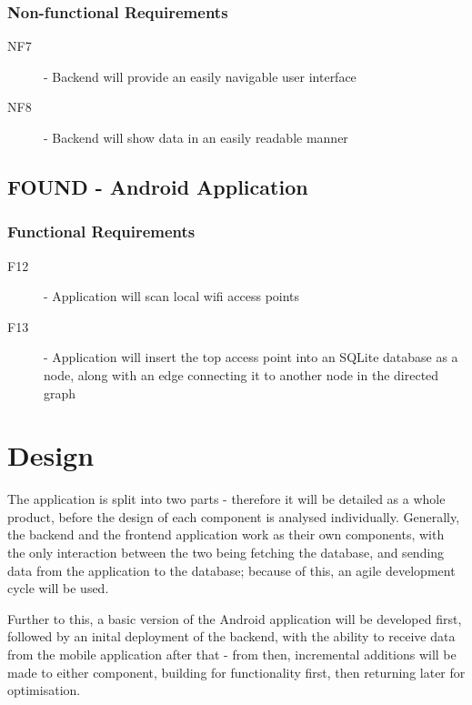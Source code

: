 \documentclass[11pt]{informatics-report}
\begin{document}
\subsection{Non-functional Requirements}

\begin{description}
\item[NF7] - Backend will provide an easily navigable user interface
\item[NF8] - Backend will show data in an easily readable manner
\end{description}

\section{FOUND - Android Application}

\subsection{Functional Requirements}

\begin{description}
\item[F12] - Application will scan local wifi access points
\item[F13] - Application will insert the top access point into an SQLite database as a node, along with an edge connecting it to another node in the directed graph
\end{description}

\chapter{Design}
The application is split into two parts - therefore it will be detailed as a whole product, before the design of each component is analysed individually. Generally, the backend and the frontend application work as their own components, with the only interaction between the two being fetching the database, and sending data from the application to the database; because of this, an agile development cycle will be used. 

Further to this, a basic version of the Android application will be developed first, followed by an inital deployment of the backend, with the ability to receive data from the mobile application after that - from then, incremental additions will be made to either component, building for functionality first, then returning later for optimisation. 
\newpage
\end{document}
